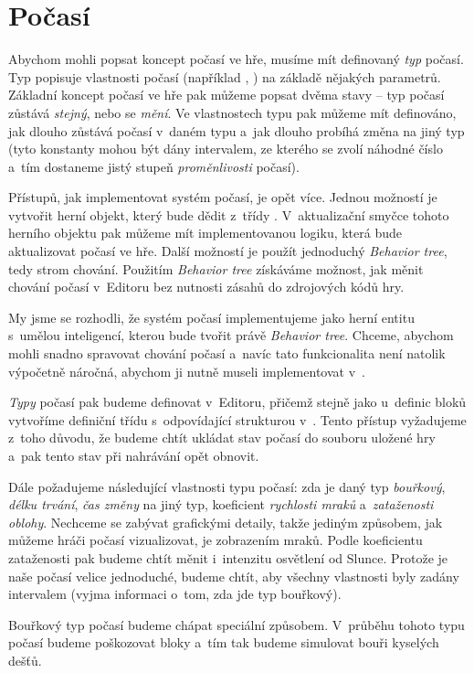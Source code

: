 
\section{Počasí}

Abychom mohli popsat koncept počasí ve hře, musíme mít definovaný \textit{typ} počasí. Typ popisuje vlastnosti počasí (například , ) na základě nějakých parametrů. Základní koncept počasí ve hře pak můžeme popsat dvěma stavy -- typ počasí zůstává \textit{stejný}, nebo se \textit{mění}. Ve vlastnostech typu pak můžeme mít definováno, jak dlouho zůstává počasí v~daném typu a~jak dlouho probíhá změna na jiný typ (tyto konstanty mohou být dány intervalem, ze kterého se zvolí náhodné číslo a~tím dostaneme jistý stupeň \textit{proměnlivosti} počasí).

Přístupů, jak implementovat systém počasí, je opět více. Jednou možností je vytvořit herní objekt, který bude dědit z~třídy . V~aktualizační smyčce tohoto herního objektu pak můžeme mít implementovanou logiku, která bude aktualizovat počasí ve hře. Další možností je použít jednoduchý \textit{Behavior tree}, tedy strom chování. Použitím \textit{Behavior tree} získáváme možnost, jak měnit chování počasí v~Editoru bez nutnosti zásahů do zdrojových kódů hry. 

My jsme se rozhodli, že systém počasí implementujeme jako herní entitu s~umělou inteligencí, kterou bude tvořit právě \textit{Behavior tree}. Chceme, abychom mohli snadno spravovat chování počasí a~navíc tato funkcionalita není natolik výpočetně náročná, abychom ji nutně museli implementovat v~\CPP{}.

\textit{Typy} počasí pak budeme definovat v~Editoru, přičemž stejně jako u~definic bloků vytvoříme definiční třídu s~odpovídající strukturou v~\CPP{}. Tento přístup vyžadujeme z~toho důvodu, že budeme chtít ukládat stav počasí do souboru uložené hry a~pak tento stav při nahrávání opět obnovit. 

Dále požadujeme následující vlastnosti typu počasí: zda je daný typ \textit{bouřkový}, \textit{délku trvání}, \textit{čas změny} na jiný typ, koeficient \textit{rychlosti mraků} a~\textit{zataženosti oblohy}. Nechceme se zabývat grafickými detaily, takže jediným způsobem, jak můžeme hráči počasí vizualizovat, je zobrazením mraků. Podle koeficientu zataženosti pak budeme chtít měnit i~intenzitu osvětlení od Slunce. Protože je naše počasí velice jednoduché, budeme chtít, aby všechny vlastnosti byly zadány intervalem (vyjma informaci o~tom, zda jde typ bouřkový).

Bouřkový typ počasí budeme chápat speciální způsobem. V~průběhu tohoto typu počasí budeme poškozovat bloky a~tím tak budeme simulovat bouři kyselých dešťů. 